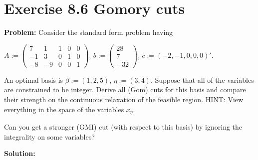 \section{Exercise 8.6 Gomory cuts}
\textbf{Problem:} Consider the standard form problem having

$A:=\left( \begin{array}{ccccc} 7 & 1 & 1 & 0 & 0 \\ -1 & 3 & 0 & 1 & 0 \\ -8 & -9 & 0 & 0 & 1 \end{array}\right)$, $b:=\left( \begin{array}{c} 28 \\ 7 \\ -32 \end{array}\right)$, $c:=(-2, -1,0,0,0)'.$

An optimal basis is $\beta:=(1,2,5)$, $\eta:=(3,4)$. Suppose that all of the variables are constrained to be integer. Derive all (Gom) cuts for this basis and compare their strength on the continuous relaxation of the feasible region. HINT: View everything in the space of the variables $x_{\eta}$.

Can you get a stronger (GMI) cut (with respect to this basis) by ignoring the integrality on some variables?

\textbf{Solution:} 